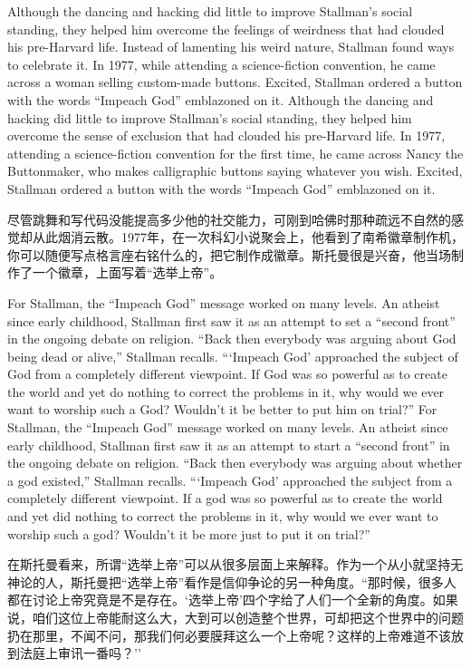 \ifdefined\eng
\ifdefined\vone
Although the dancing and hacking did little to improve Stallman's social standing, they helped him overcome the feelings of weirdness that had clouded his pre-Harvard life. Instead of lamenting his weird nature, Stallman found ways to celebrate it. In 1977, while attending a science-fiction convention, he came across a woman selling custom-made buttons. Excited, Stallman ordered a button with the words ``Impeach God'' emblazoned on it.
\fi
\ifdefined\vtwo
Although the dancing and hacking did little to improve Stallman's social standing, they helped him overcome the sense of exclusion that had clouded his pre-Harvard life. In 1977, attending a science-fiction convention for the first time, he came across Nancy the Buttonmaker, who makes calligraphic buttons saying whatever you wish. Excited, Stallman ordered a button with the words ``Impeach God'' emblazoned on it.
\fi
\fi

\ifdefined\chs
尽管跳舞和写代码没能提高多少他的社交能力，可刚到哈佛时那种疏远不自然的感觉却从此烟消云散。1977年，在一次科幻小说聚会上，他看到了南希徽章制作机，你可以随便写点格言座右铭什么的，把它制作成徽章。斯托曼很是兴奋，他当场制作了一个徽章，上面写着``选举上帝''。
\fi

\ifdefined\eng
\ifdefined\vone
For Stallman, the ``Impeach God'' message worked on many levels. An atheist since early childhood, Stallman first saw it as an attempt to set a ``second front'' in the ongoing debate on religion. ``Back then everybody was arguing about God being dead or alive,'' Stallman recalls. ```Impeach God' approached the subject of God from a completely different viewpoint. If God was so powerful as to create the world and yet do nothing to correct the problems in it, why would we ever want to worship such a God? Wouldn't it be better to put him on trial?''
\fi
\ifdefined\vtwo
For Stallman, the ``Impeach God'' message worked on many levels. An atheist since early childhood, Stallman first saw it as an attempt to start a ``second front'' in the ongoing debate on religion. ``Back then everybody was arguing about whether a god existed,'' Stallman recalls. ```Impeach God' approached the subject from a completely different viewpoint. If a god was so powerful as to create the world and yet did nothing to correct the problems in it, why would we ever want to worship such a god? Wouldn't it be more just to put it on trial?''
\fi
\fi

\ifdefined\chs
在斯托曼看来，所谓``选举上帝''可以从很多层面上来解释。作为一个从小就坚持无神论的人，斯托曼把``选举上帝''看作是信仰争论的另一种角度。``那时候，很多人都在讨论上帝究竟是不是存在。`选举上帝'四个字给了人们一个全新的角度。如果说，咱们这位上帝能耐这么大，大到可以创造整个世界，可却把这个世界中的问题扔在那里，不闻不问，那我们何必要膜拜这么一个上帝呢？这样的上帝难道不该放到法庭上审讯一番吗？''
\fi

